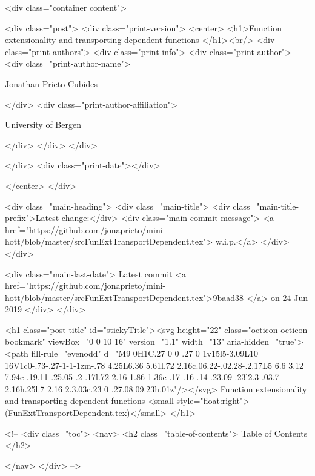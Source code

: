       <div class="container content">
        







<div class="post">
  <div class="print-version">
    <center>
      <h1>Function extensionality and transporting dependent functions </h1><br/>
        <div class="print-authors">
          <div class="print-info">
            <div class="print-author">
              <div class="print-author-name">
                
                  Jonathan Prieto-Cubides
                
              </div>
              <div class="print-author-affiliation">
                
                  University of Bergen
                
                </div>
            </div>
          </div>
          
          
        </div>
        <div class="print-date"></div>
        
        
    </center>
  </div>

  
  <div class="main-heading">
    <div class="main-title">
      <div class="main-title-prefix">Latest change:</div>
      <div class="main-commit-message">
            <a href="https://github.com/jonaprieto/mini-hott/blob/master/srcFunExtTransportDependent.tex">
              w.i.p.</a>
      </div>
    </div>

    <div class="main-last-date">
      Latest commit <a href="https://github.com/jonaprieto/mini-hott/blob/master/srcFunExtTransportDependent.tex">9baad38 </a> on  24 Jun 2019
    </div>
  </div>
  

  <h1 class="post-title" id="stickyTitle"><svg height="22" class="octicon octicon-bookmark" viewBox="0 0 10 16" version="1.1" width="13" aria-hidden="true"><path fill-rule="evenodd" d="M9 0H1C.27 0 0 .27 0 1v15l5-3.09L10 16V1c0-.73-.27-1-1-1zm-.78 4.25L6.36 5.61l.72 2.16c.06.22-.02.28-.2.17L5 6.6 3.12 7.94c-.19.11-.25.05-.2-.17l.72-2.16-1.86-1.36c-.17-.16-.14-.23.09-.23l2.3-.03.7-2.16h.25l.7 2.16 2.3.03c.23 0 .27.08.09.23h.01z"/></svg> Function extensionality and transporting dependent functions  <small style="float:right">(FunExtTransportDependent.tex)</small>
  </h1>

  <!-- 
  <div class="toc">
    <nav>
    <h2 class="table-of-contents"> Table of Contents </h2>
      

    </nav>
  </div>
   -->

